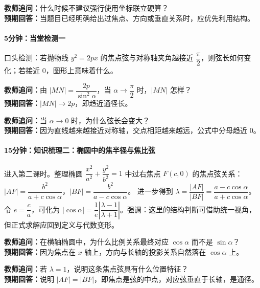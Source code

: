 \documentclass[UTF8,a4paper,11pt]{ctexart}
\begin{document}
\noindent\textbf{教师追问：}什么时候不建议强行使用坐标联立硬算？\\

\textbf{预期回答：}当题目已经明确给出过焦点、方向或垂直关系时，应优先利用结构。\par

\paragraph{5分钟：当堂检测一}

口头检测：若抛物线 $y^2=2px$ 的焦点弦与对称轴夹角越接近 $\dfrac\pi2$，则弦长如何变化；若接近 $0$，图形上意味着什么。

\noindent\textbf{教师追问：}由 $|MN|=\dfrac{2p}{\sin^2\alpha}$，当 $\alpha\to \dfrac\pi2$ 时，$|MN|$ 怎样？\\

\textbf{预期回答：}$|MN|\to 2p$，即趋近通径长。\par

\noindent\textbf{教师追问：}当 $\alpha\to 0$ 时，为什么弦长会变大？\\

\textbf{预期回答：}因为直线越来越接近对称轴，交点相距越来越远，公式中分母趋近 $0$。\par

\paragraph{15分钟：知识梳理二：椭圆中的焦半径与焦比弦}

进入第二课时。整理椭圆 $\dfrac{x^2}{a^2}+\dfrac{y^2}{b^2}=1$ 中过右焦点 $F(c,0)$ 的焦点弦关系：
$|AF|=\dfrac{b^2}{a+c\cos\alpha}$，$|BF|=\dfrac{b^2}{a-c\cos\alpha}$。
进一步得到
$\lambda=\dfrac{|AF|}{|BF|}=\dfrac{a-c\cos\alpha}{a+c\cos\alpha}$。
令 $e=\dfrac ca$，可化为
$\left|\cos\alpha\right|=\dfrac{1}{e}\left|\dfrac{\lambda-1}{\lambda+1}\right|$。强调：这里的结构判断可借助统一视角，但正式求解应回到定义与代数变形。

\noindent\textbf{教师追问：}在横轴椭圆中，为什么比例关系最终对应 $\cos\alpha$ 而不是 $\sin\alpha$？\\

\textbf{预期回答：}因为焦点在 $x$ 轴上，方向与长轴的投影关系自然落在 $\cos\alpha$ 上。\par

\noindent\textbf{教师追问：}若 $\lambda=1$，说明这条焦点弦具有什么位置特征？\\

\textbf{预期回答：}说明 $|AF|=|BF|$，即焦点是弦的中点，对应弦垂直于长轴，是通径。\par
\end{document}
